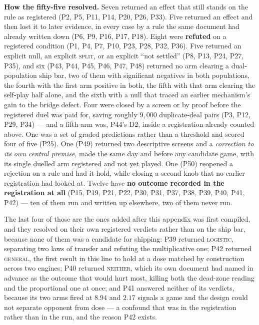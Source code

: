 \noindent\textbf{How the fifty-five resolved.} Seven returned an effect that
still stands on the rule as registered (P2, P5, P11, P14, P20, P26, P33). Five
returned an effect and then lost it to later evidence, in every case by a rule
the same document had already written down (P6, P9, P16, P17, P18). Eight were
\textbf{refuted} on a registered condition (P1, P4, P7, P10, P23, P28, P32,
P36). Five returned an explicit null, an explicit \textsc{split}, or an
explicit ``not settled'' (P8, P13, P24, P27, P35), and six (P43, P44, P45,
P46, P47, P48) returned no arm clearing a dual-population ship bar, two of
them with significant negatives in both populations, the fourth with the
first arm positive in both, the fifth with that arm clearing the self-play
half alone, and the sixth with a null that traced an earlier mechanism's
gain to the bridge defect. Four were closed by a screen or by
proof before the registered duel was paid for, saving roughly $9{,}000$
duplicate-deal pairs (P3, P12, P29, P34) --- and a fifth arm was, P44's D2,
inside a registration already counted above. One was a set of graded
predictions rather than a threshold and scored four of five (P25). One (P49)
returned two descriptive screens and a \emph{correction to its own central
premise}, made the same day and before any candidate game, with its single
duelled arm registered and not yet played. One (P50) reopened a
rejection on a rule and had it hold, while closing a second knob that no
earlier registration had looked at. Twelve have
\textbf{no outcome recorded in the registration at all} (P15, P19, P21, P22,
P30, P31, P37, P38, P39, P40, P41, P42) --- ten of them run and written up
elsewhere, two of them never run.

\noindent The last four of those are the ones added after this appendix was
first compiled, and they resolved on their own registered verdicts rather than
on the ship bar, because none of them was a candidate for shipping: P39
returned \textsc{logistic}, separating two laws of transfer and refuting the
multiplicative one; P42 returned \textsc{general}, the first result in this
line to hold at a dose matched by construction across two engines; P40 returned
\textsc{neither}, which its own document had named in advance as the outcome
that would hurt most, killing both the dead-zone reading and the proportional
one at once; and P41 answered neither of its verdicts, because its two arms
fired at $8.94$ and $2.17$ signals a game and the design could not separate
opponent from dose --- a confound that was in the registration rather than in
the run, and the reason P42 exists.


